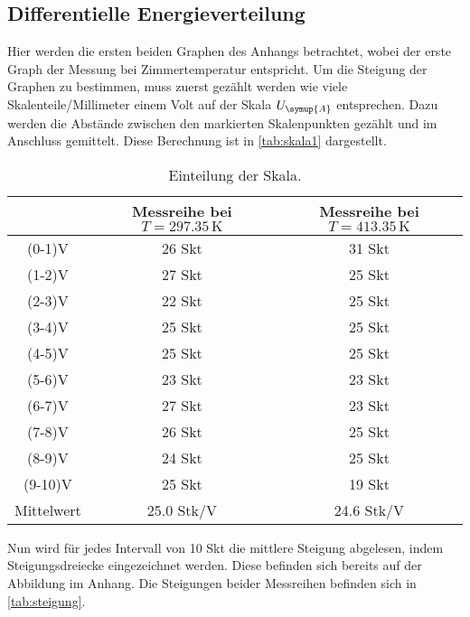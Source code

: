 \subsection{Differentielle Energieverteilung}
Hier werden die ersten beiden Graphen des Anhangs betrachtet, wobei der erste Graph der Messung bei Zimmertemperatur entspricht. Um die Steigung der 
Graphen zu bestimmen, muss zuerst gezählt werden wie viele Skalenteile/Millimeter einem Volt auf der Skala $U_{\symup{A}}$ entsprechen. Dazu werden 
die Abstände zwischen den markierten Skalenpunkten gezählt und im Anschluss gemittelt. Diese Berechnung ist in \autoref{tab:skala1} dargestellt.
\begin{table}
    \centering
    \caption{Einteilung der Skala.}
\begin{tabular}{c c c}
    \toprule
         & Messreihe bei $T=297.35\,\unit{\kelvin}$ & Messreihe bei $T=413.35\,\unit{\kelvin}$ \\
    \midrule
    (0-1)V & 26 Skt & 31 Skt \\
    (1-2)V & 27 Skt & 25 Skt \\
    (2-3)V & 22 Skt & 25 Skt \\
    (3-4)V & 25 Skt & 25 Skt \\
    (4-5)V & 25 Skt & 25 Skt\\
    (5-6)V & 23 Skt &  23 Skt \\
    (6-7)V & 27 Skt & 23 Skt \\
    (7-8)V & 26 Skt & 25 Skt \\
    (8-9)V & 24 Skt & 25 Skt \\
    (9-10)V & 25 Skt & 19 Skt \\
    \midrule
    Mittelwert & 25.0 Stk/V & 24.6 Stk/V \\
     \bottomrule
    \end{tabular}
    \label{tab: temp}
\end{table}

Nun wird für jedes Intervall von 10 Skt die mittlere Steigung abgelesen, indem Steigungsdreiecke eingezeichnet werden. Diese befinden sich bereits auf der 
Abbildung im Anhang. Die Steigungen beider Messreihen befinden sich in \autoref{tab:steigung}.

